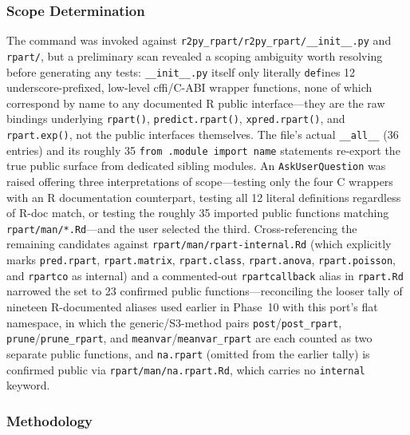 \documentclass[12pt]{article}
\begin{document}
\subsubsection{Scope Determination}

The command was invoked against \texttt{r2py\_rpart/r2py\_rpart/\_\_init\_\_.py} and \texttt{rpart/}, but a preliminary scan revealed a scoping ambiguity worth resolving before generating any tests: \texttt{\_\_init\_\_.py} itself only literally \texttt{def}ines 12 underscore-prefixed, low-level cffi/C-ABI wrapper functions, none of which correspond by name to any documented R public interface---they are the raw bindings underlying \texttt{rpart()}, \texttt{predict.rpart()}, \texttt{xpred.rpart()}, and \texttt{rpart.exp()}, not the public interfaces themselves. The file's actual \texttt{\_\_all\_\_} (36 entries) and its roughly 35 \texttt{from .module import name} statements re-export the true public surface from dedicated sibling modules. An \texttt{AskUserQuestion} was raised offering three interpretations of scope---testing only the four C wrappers with an R documentation counterpart, testing all 12 literal definitions regardless of R-doc match, or testing the roughly 35 imported public functions matching \texttt{rpart/man/*.Rd}---and the user selected the third. Cross-referencing the remaining candidates against \texttt{rpart/man/rpart-internal.Rd} (which explicitly marks \texttt{pred.rpart}, \texttt{rpart.matrix}, \texttt{rpart.class}, \texttt{rpart.anova}, \texttt{rpart.poisson}, and \texttt{rpartco} as internal) and a commented-out \texttt{rpartcallback} alias in \texttt{rpart.Rd} narrowed the set to 23 confirmed public functions---reconciling the looser tally of nineteen R-documented aliases used earlier in Phase~10 with this port's flat namespace, in which the generic/S3-method pairs \texttt{post}/\texttt{post\_rpart}, \texttt{prune}/\texttt{prune\_rpart}, and \texttt{meanvar}/\texttt{meanvar\_rpart} are each counted as two separate public functions, and \texttt{na.rpart} (omitted from the earlier tally) is confirmed public via \texttt{rpart/man/na.rpart.Rd}, which carries no \texttt{internal} keyword.

\subsubsection{Methodology}
\end{document}
